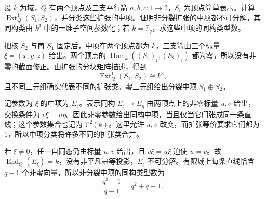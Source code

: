 \begin{optionalexercise}\label{b5:ex:09-three-arrow-extension-classes}
	设 \(k\) 为域，\(Q\) 有两个顶点及三支平行箭 \(a,b,c:1\to2\)，\(S_i\) 为顶点简单表示。计算 \(\operatorname{Ext}^1_Q(S_1,S_2)\)，并分类这些扩张的中项。证明非分裂扩张的中项都不可分解，其同构类由 \(k^3\) 中的一维子空间参数化；若 \(k=\mathbb F_q\)，求这些中项的同构类型数。
\end{optionalexercise}
\begin{solution}
	把核 \(S_2\) 与商 \(S_1\) 固定后，中项在两个顶点都为 \(k\)，三支箭由三个标量 \(\xi=(x,y,z)\) 给出。两个顶点的 \(\operatorname{Hom}_k((S_1)_i,(S_2)_i)\) 都为零，所以没有非零的截面修正。由扩张的分块矩阵描述，得到
	\[
		\operatorname{Ext}^1_Q(S_1,S_2)\cong k^3,
	\]
	且不同三元组确实代表不同的扩张类。零三元组给出分裂中项 \(S_1\oplus S_2\)。

	记参数为 \(\xi\) 的中项为 \(E_\xi\)。表示同构 \(E_\xi\to E_\eta\) 由两顶点上的非零标量 \(u,v\) 给出，交换条件为 \(v\xi=u\eta\)。因此非零参数给出同构中项，当且仅当它们张成同一条直线；这个参数集合也记为 \(\mathbb P^2(k)\)。这里允许 \(u,v\) 改变，而扩张等价要求它们都为 \(1\)，所以中项分类将许多不同的扩张类合并。

	若 \(\xi\ne0\)，任一自同态仍由标量 \(u,v\) 给出，且 \(v\xi=u\xi\) 迫使 \(u=v\)。故 \(\operatorname{End}_Q(E_\xi)=k\)，没有非平凡幂等投影，\(E_\xi\) 不可分解。有限域上每条直线恰含 \(q-1\) 个非零向量，所以非分裂中项的同构类型数为
	\[
		\frac{q^3-1}{q-1}=q^2+q+1.
	\]
\end{solution}

